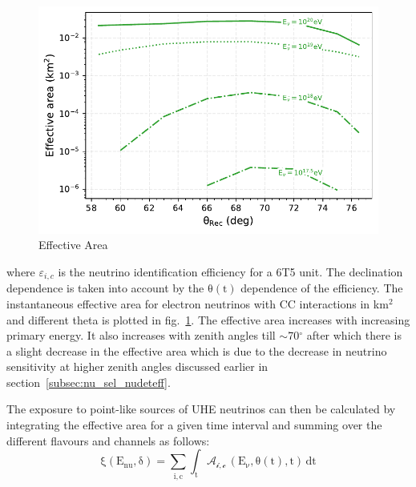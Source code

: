 \begin{figure}[t!]
  \centering
  \includegraphics[width=14.5cm]{thesis_figures/PointLimits/EffArea_vs_Theta_CC_optim.pdf}
  \caption{Effective Area}
  \label{fig:Eff_Area}
\end{figure}


where $\varepsilon_{i,c}$ is the neutrino identification efficiency for a 6T5 unit. The declination dependence is taken into account by the $\mathrm{\theta(t)}$ dependence of the efficiency. The instantaneous effective area for electron neutrinos with CC interactions in km$^2$ and different theta is plotted in fig.~\ref{fig:Eff_Area}. The effective area increases with increasing primary energy. It also increases with zenith angles till $\sim$70$^\circ$ after which there is a slight decrease in the effective area which is due to the decrease in neutrino sensitivity at higher zenith angles discussed earlier in section~\ref{subsec:nu_sel_nudeteff}. 

The exposure to point-like sources of UHE neutrinos can then be calculated by integrating the effective area for a given time interval and summing over the different flavours and channels as follows:
\begin{equation}
  \label{eq:exposure_point}
  \mathrm{\xi(E_{nu}, \delta) = \sum_{i,c} \int_{t} \mathcal{A_{i,c}} \, (E_{\nu},\theta(t),t) \, dt}
\end{equation}

